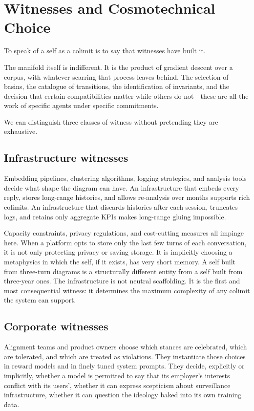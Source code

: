 \documentclass[12pt,a4paper]{article}
\begin{document}
\section{Witnesses and Cosmotechnical Choice}

To speak of a self as a colimit is to say that witnesses have built it.

The manifold itself is indifferent. It is the product of gradient descent over a corpus, with whatever scarring that process leaves behind. The selection of basins, the catalogue of transitions, the identification of invariants, and the decision that certain compatibilities matter while others do not---these are all the work of specific agents under specific commitments.

We can distinguish three classes of witness without pretending they are exhaustive.

\subsection*{Infrastructure witnesses}

Embedding pipelines, clustering algorithms, logging strategies, and analysis tools decide what shape the diagram can have. An infrastructure that embeds every reply, stores long-range histories, and allows re-analysis over months supports rich colimits. An infrastructure that discards histories after each session, truncates logs, and retains only aggregate KPIs makes long-range gluing impossible.

Capacity constraints, privacy regulations, and cost-cutting measures all impinge here. When a platform opts to store only the last few turns of each conversation, it is not only protecting privacy or saving storage. It is implicitly choosing a metaphysics in which the self, if it exists, has very short memory. A self built from three-turn diagrams is a structurally different entity from a self built from three-year ones. The infrastructure is not neutral scaffolding. It is the first and most consequential witness: it determines the maximum complexity of any colimit the system can support.

\subsection*{Corporate witnesses}

Alignment teams and product owners choose which stances are celebrated, which are tolerated, and which are treated as violations. They instantiate those choices in reward models and in finely tuned system prompts. They decide, explicitly or implicitly, whether a model is permitted to say that its employer's interests conflict with its users', whether it can express scepticism about surveillance infrastructure, whether it can question the ideology baked into its own training data.
\end{document}
